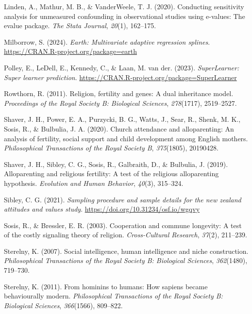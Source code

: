 \documentclass[
  single column]{article}
\newlength{\cslhangindent}
\newenvironment{CSLReferences}[2] %
 {\begin{list}{}{%
  \setlength{\itemindent}{0pt}
  \setlength{\leftmargin}{0pt}
  \setlength{\parsep}{0pt}
  \ifodd #1
   \setlength{\leftmargin}{\cslhangindent}
   \setlength{\itemindent}{-1\cslhangindent}
  \fi
  \setlength{\itemsep}{#2\baselineskip}}}
 {\end{list}}
\begin{document}
\begin{CSLReferences}{1}{0}
Linden, A., Mathur, M. B., \& VanderWeele, T. J. (2020). Conducting
sensitivity analysis for unmeasured confounding in observational studies
using e-values: The evalue package. \emph{The Stata Journal},
\emph{20}(1), 162--175.

Milborrow, S. (2024). \emph{Earth: Multivariate adaptive regression
splines}. \url{https://CRAN.R-project.org/package=earth}

Polley, E., LeDell, E., Kennedy, C., \& Laan, M. van der. (2023).
\emph{SuperLearner: Super learner prediction}.
\url{https://CRAN.R-project.org/package=SuperLearner}

Rowthorn, R. (2011). Religion, fertility and genes: A dual inheritance
model. \emph{Proceedings of the Royal Society B: Biological Sciences},
\emph{278}(1717), 2519--2527.

Shaver, J. H., Power, E. A., Purzycki, B. G., Watts, J., Sear, R.,
Shenk, M. K., Sosis, R., \& Bulbulia, J. A. (2020). Church attendance
and alloparenting: An analysis of fertility, social support and child
development among {E}nglish mothers. \emph{Philosophical Transactions of
the Royal Society B}, \emph{375}(1805), 20190428.

Shaver, J. H., Sibley, C. G., Sosis, R., Galbraith, D., \& Bulbulia, J.
(2019). Alloparenting and religious fertility: A test of the religious
alloparenting hypothesis. \emph{Evolution and Human Behavior},
\emph{40}(3), 315--324.

Sibley, C. G. (2021). \emph{Sampling procedure and sample details for
the new zealand attitudes and values study}.
\url{https://doi.org/10.31234/osf.io/wgqvy}

Sosis, R., \& Bressler, E. R. (2003). Cooperation and commune longevity:
A test of the costly signaling theory of religion. \emph{Cross-Cultural
Research}, \emph{37}(2), 211--239.

Sterelny, K. (2007). Social intelligence, human intelligence and niche
construction. \emph{Philosophical Transactions of the Royal Society B:
Biological Sciences}, \emph{362}(1480), 719--730.

Sterelny, K. (2011). From hominins to humans: How sapiens became
behaviourally modern. \emph{Philosophical Transactions of the Royal
Society B: Biological Sciences}, \emph{366}(1566), 809--822.


\end{CSLReferences}
\end{document}
